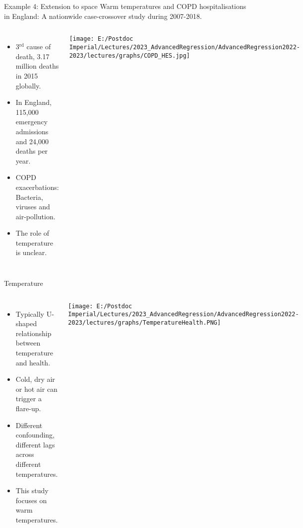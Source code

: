\documentclass{beamer}
\begin{document}
\begin{frame}[fragile]{Example 4: Extension to space}
Warm temperatures and COPD hospitalisations in England: A nationwide case-crossover study during 2007-2018.
    \begin{columns}
	\begin{itemize}
		\item 3$^{\text{rd}}$ cause of death, 3.17 million deaths in 2015 globally.
		\item In England, 115,000 emergency admissions and 24,000 deaths per year.
		\item COPD exacerbations: Bacteria, viruses and air-pollution.
		\item The role of temperature is unclear. 
	\end{itemize}
	\texttt{[image: E:/Postdoc Imperial/Lectures/2023\_AdvancedRegression/AdvancedRegression2022-2023/lectures/graphs/COPD\_HES.jpg]}
\end{columns}
\end{frame}


\begin{frame}{Temperature}
	\begin{columns}
		\begin{itemize}
			\item Typically U-shaped relationship between temperature and health.
			\item Cold, dry air or hot air can trigger a flare-up.
			\item Different confounding, different lags across different temperatures.
			\item This study focuses on warm temperatures.
		\end{itemize}
		\texttt{[image: E:/Postdoc Imperial/Lectures/2023\_AdvancedRegression/AdvancedRegression2022-2023/lectures/graphs/TemperatureHealth.PNG]}
	\end{columns}
	
\end{frame}
\end{document}
